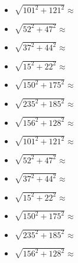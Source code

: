 



\begin{multicols}{3}

\begin{itemize}[label={$\bullet$}]
  \item $\sqrt{101^2 + 121^2} \approx $ \dotfill \\
  \item $\sqrt{52^2 + 47^2} \approx $ \dotfill \\
  \item $\sqrt{37^2 + 44^2} \approx $ \dotfill \\
  \item $\sqrt{15^2 + 22^2} \approx $ \dotfill \\
  \item $\sqrt{150^2 + 175^2} \approx $ \dotfill \\
  \item $\sqrt{235^2 + 185^2} \approx $ \dotfill \\
  \item $\sqrt{156^2 + 128^2} \approx $ \dotfill \\ 
\end{itemize}


\begin{itemize}[label={$\bullet$}]
  \item $\sqrt{101^2 + 121^2} \approx $ \dotfill \\
  \item $\sqrt{52^2 + 47^2} \approx $ \dotfill \\
  \item $\sqrt{37^2 + 44^2} \approx $ \dotfill \\
  \item $\sqrt{15^2 + 22^2} \approx $ \dotfill \\
  \item $\sqrt{150^2 + 175^2} \approx $ \dotfill \\
  \item $\sqrt{235^2 + 185^2} \approx $ \dotfill \\
  \item $\sqrt{156^2 + 128^2} \approx $ \dotfill \\ 
\end{itemize}



\end{multicols}
